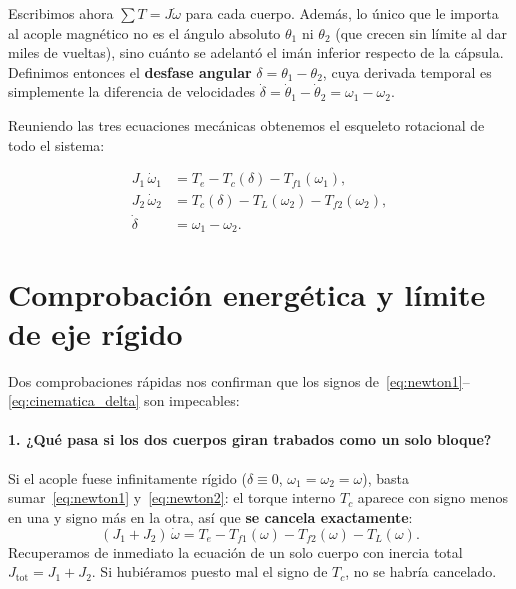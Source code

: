 \documentclass[11pt,a4paper,oneside]{book}
\begin{document}
Escribimos ahora $\sum T = J\dot\omega$ para cada cuerpo. Además, lo único que le
importa al acople magnético no es el ángulo absoluto $\theta_1$ ni $\theta_2$
(que crecen sin límite al dar miles de vueltas), sino cuánto se adelantó el
imán inferior respecto de la cápsula. Definimos entonces el \textbf{desfase
angular} $\delta = \theta_1 - \theta_2$, cuya derivada temporal es simplemente
la diferencia de velocidades $\dot\delta = \dot\theta_1 - \dot\theta_2 = \omega_1 - \omega_2$.

Reuniendo las tres ecuaciones mecánicas obtenemos el esqueleto rotacional de
todo el sistema:
\begin{ecuacionclave}
\begin{align}
  J_1\,\dot\omega_1 &= T_e - T_c(\delta) - T_{f1}(\omega_1), \label{eq:newton1}\\
  J_2\,\dot\omega_2 &= T_c(\delta) - T_L(\omega_2) - T_{f2}(\omega_2), \label{eq:newton2}\\
  \dot\delta        &= \omega_1 - \omega_2. \label{eq:cinematica_delta}
\end{align}
\end{ecuacionclave}

\section{Comprobación energética y límite de eje rígido}

Dos comprobaciones rápidas nos confirman que los signos
de~\eqref{eq:newton1}--\eqref{eq:cinematica_delta} son impecables:

\paragraph{1. ¿Qué pasa si los dos cuerpos giran trabados como un solo bloque?}
Si el acople fuese infinitamente rígido ($\delta \equiv 0$, $\omega_1 = \omega_2 = \omega$),
basta sumar~\eqref{eq:newton1} y~\eqref{eq:newton2}: el torque interno $T_c$
aparece con signo menos en una y signo más en la otra, así que \textbf{se cancela
exactamente}:
\[
  (J_1 + J_2)\,\dot\omega = T_e - T_{f1}(\omega) - T_{f2}(\omega) - T_L(\omega).
\]
Recuperamos de inmediato la ecuación de un solo cuerpo con inercia total
$J_{\text{tot}} = J_1 + J_2$. Si hubiéramos puesto mal el signo de $T_c$, no se
habría cancelado.
\end{document}
